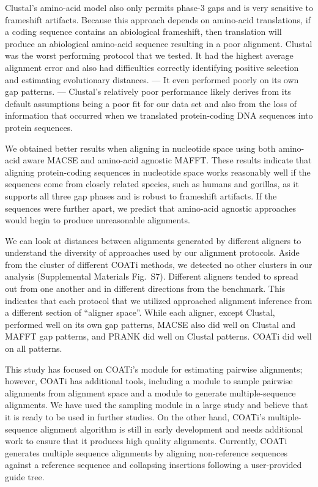 \documentclass[12pt,letterpaper]{article}
\begin{document}
Clustal\textOmega{}'s amino-acid model also only permits phase-3 gaps and is very sensitive to frameshift artifacts. Because this approach depends on amino-acid translations, if a coding sequence contains an abiological frameshift, then translation will produce an abiological amino-acid sequence resulting in a poor alignment. Clustal\textOmega{} was the worst performing protocol that we tested. It had the highest average alignment error and also had difficulties correctly identifying positive selection and estimating evolutionary distances.  --- It even performed poorly on its own gap patterns. --- Clustal\textOmega{}'s relatively poor performance likely derives from its default assumptions being a poor fit for our data set and also from the loss of information that occurred when we translated protein-coding DNA sequences into protein sequences.

We obtained better results when aligning in nucleotide space using both amino-acid aware MACSE and amino-acid agnostic MAFFT. These results indicate that aligning protein-coding sequences in nucleotide space works reasonably well if the sequences come from closely related species, such as humans and gorillas, as it supports all three gap phases and is robust to frameshift artifacts. If the sequences were further apart, we predict that amino-acid agnostic approaches would begin to produce unreasonable alignments. 

We can look at distances between alignments generated by different aligners to understand the diversity of approaches used by our alignment protocols. Aside from the cluster of different COATi methods, we detected no other clusters in our analysis (Supplemental Materials Fig.~S7). Different aligners tended to spread out from one another and in different directions from the benchmark. This indicates that each protocol that we utilized approached alignment inference from a different section of ``aligner space''. While each aligner, except Clustal\textOmega{}, performed well on its own gap patterns, MACSE also did well on Clustal\textOmega{} and MAFFT gap patterns, and PRANK did well on Clustal\textOmega{} patterns. COATi did well on all patterns.

This study has focused on COATi's module for estimating pairwise alignments; however, COATi has additional tools, including a module to sample pairwise alignments from alignment space and a module to generate multiple-sequence alignments. We have used the sampling module in a large study \citep{zhu2022profiling} and believe that it is ready to be used in further studies. On the other hand, COATi's multiple-sequence alignment algorithm is still in early development and needs additional work to ensure that it produces high quality alignments. Currently, COATi generates multiple sequence alignments by aligning non-reference sequences against a reference sequence and collapsing insertions following a user-provided guide tree.
\end{document}

